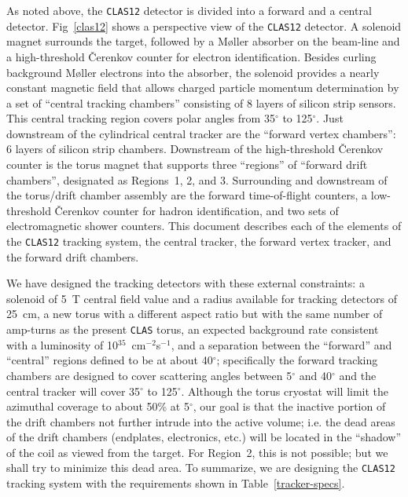 As noted above, the {\tt CLAS12} detector is divided into a forward and a 
central detector.  Fig~\ref{clas12} shows a perspective view of the 
{\tt CLAS12} detector.  A solenoid magnet surrounds the target,  followed 
by a M{\o}ller absorber on the beam-line and a high-threshold {\v C}erenkov 
counter for electron identification.  Besides curling background M{\o}ller 
electrons into the absorber, the solenoid provides a nearly constant magnetic 
field that allows charged particle momentum determination by a set of 
``central tracking chambers'' consisting of 8 layers of silicon strip sensors.
This central tracking region covers polar angles from 35$^\circ$ to 
125$^\circ$.  Just downstream of the cylindrical central tracker are the 
``forward vertex chambers'': 6 layers of silicon strip chambers.  Downstream 
of the high-threshold {\v C}erenkov counter is the torus magnet that supports 
three ``regions'' of ``forward drift chambers'', designated as Regions~1, 2, 
and 3.  Surrounding and downstream of the torus/drift chamber assembly are 
the forward time-of-flight counters, a low-threshold {\v C}erenkov counter 
for hadron identification, and two sets of electromagnetic shower counters.  
This document describes each of the elements of the {\tt CLAS12} tracking 
system, the central tracker, the forward vertex tracker, and the forward 
drift chambers.

We have designed the tracking detectors with these external constraints: a 
solenoid of 5~T central field value and a radius available for tracking 
detectors of 25~cm, a new torus with a different aspect ratio but with the 
same number of amp-turns as the present {\tt CLAS} torus, an expected
background rate consistent with a luminosity of 10$^{35}$~cm$^{-2}$s$^{-1}$, 
and a separation between the ``forward'' and ``central'' regions defined to 
be at about 40$^\circ$; specifically the forward tracking chambers are 
designed to cover scattering angles between 5$^\circ$ and 40$^\circ$ and the 
central tracker will cover 35$^\circ$ to 125$^\circ$.  Although the torus 
cryostat will limit the azimuthal coverage to about 50\% at 5$^\circ$, our 
goal is that the inactive portion of the drift chambers not further intrude 
into the active volume; i.e. the dead areas of the drift chambers (endplates, 
electronics, etc.) will be located in the ``shadow'' of the coil as viewed 
from the target.  For Region~2, this is not possible; but we shall try to 
minimize this dead area.  To summarize, we are designing the {\tt CLAS12} 
tracking system with the requirements shown in Table~\ref{tracker-specs}.

